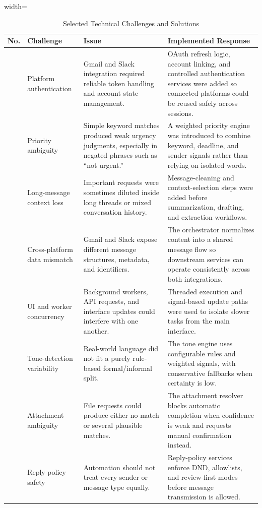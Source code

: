 \begin{table}[!htbp]
\centering
\footnotesize
\renewcommand{\arraystretch}{1.15}
\setlength{\tabcolsep}{5pt}
\begin{adjustbox}{width=\textwidth}
\begin{tabular}{|>{\raggedright\arraybackslash}p{0.8cm}|>{\raggedright\arraybackslash}p{3.2cm}|>{\raggedright\arraybackslash}p{5.1cm}|>{\raggedright\arraybackslash}p{6.1cm}|}
\hline
\textbf{No.} & \textbf{Challenge} & \textbf{Issue} & \textbf{Implemented Response} \\ \hline
1 & Platform authentication & Gmail and Slack integration required reliable token handling and account state management. & OAuth refresh logic, account linking, and controlled authentication services were added so connected platforms could be reused safely across sessions. \\ \hline
2 & Priority ambiguity & Simple keyword matches produced weak urgency judgments, especially in negated phrases such as ``not urgent.'' & A weighted priority engine was introduced to combine keyword, deadline, and sender signals rather than relying on isolated words. \\ \hline
3 & Long-message context loss & Important requests were sometimes diluted inside long threads or mixed conversation history. & Message-cleaning and context-selection steps were added before summarization, drafting, and extraction workflows. \\ \hline
4 & Cross-platform data mismatch & Gmail and Slack expose different message structures, metadata, and identifiers. & The orchestrator normalizes content into a shared message flow so downstream services can operate consistently across both integrations. \\ \hline
5 & UI and worker concurrency & Background workers, API requests, and interface updates could interfere with one another. & Threaded execution and signal-based update paths were used to isolate slower tasks from the main interface. \\ \hline
6 & Tone-detection variability & Real-world language did not fit a purely rule-based formal/informal split. & The tone engine uses configurable rules and weighted signals, with conservative fallbacks when certainty is low. \\ \hline
7 & Attachment ambiguity & File requests could produce either no match or several plausible matches. & The attachment resolver blocks automatic completion when confidence is weak and requests manual confirmation instead. \\ \hline
8 & Reply policy safety & Automation should not treat every sender or message type equally. & Reply-policy services enforce DND, allowlists, and review-first modes before message transmission is allowed. \\ \hline
\end{tabular}
\end{adjustbox}
\caption{Selected Technical Challenges and Solutions}
\label{tab:technical_challenges}
\end{table}

